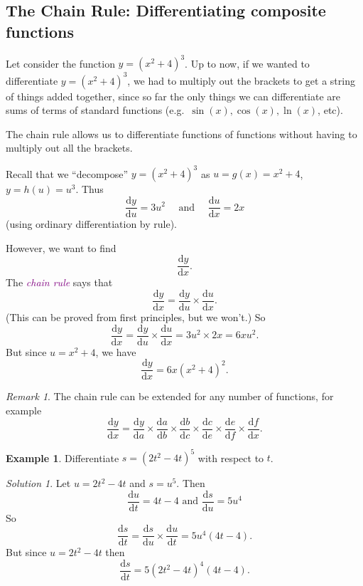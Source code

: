 \documentclass[
  english,
  11pt,
  oneside]{book}
\newcommand{\slide}{}
\theoremstyle{definition}
\theoremstyle{definition}
\newtheorem{example}{Example}[chapter]
\theoremstyle{definition}
\theoremstyle{definition}
\theoremstyle{remark}
\newtheorem*{remark}{Remark}
\newtheorem*{solution}{Solution}
\begin{document}
\subsection{The Chain Rule: Differentiating composite functions}\label{the-chain-rule-differentiating-composite-functions}

Let consider the function \(y = (x^2+ 4)^3\). Up to now, if we wanted to differentiate \(y = (x^2 + 4)^3\), we had to multiply out the brackets to get a string of things added together, since so far the only things we can differentiate are sums of terms of standard functions (e.g.~\(\sin(x), \cos(x), \ln(x)\), etc).

The chain rule allows us to differentiate functions of functions without having to multiply out all the brackets.

\slide

Recall that we ``decompose'' \(y=(x^2+4)^3\) as \(u = g(x) = x^2+4\), \(y = h(u) = u^3\).
Thus
\[\frac{\mathrm{d} y}{\mathrm{d} u} = 3u^2 \quad\text{ and }\quad
\frac{\mathrm{d} u}{\mathrm{d} x} = 2x\]
(using ordinary differentiation by rule).

However, we want to find
\[\frac{\mathrm{d} y}{\mathrm{d} x}.\]
The \textcolor{purple}{\em chain rule} says that
\[\frac{\mathrm{d} y}{\mathrm{d} x} = \frac{\mathrm{d} y}{\mathrm{d} u}\times \frac{\mathrm{d} u}{\mathrm{d} x}.\]
(This can be proved from first principles, but we won't.)
So
\[\frac{\mathrm{d} y}{\mathrm{d} x} = \frac{\mathrm{d} y}{\mathrm{d} u}\times \frac{\mathrm{d} u}{\mathrm{d} x} = 3u^2\times 2x = 6xu^2.\]
But since \(u = x^2+4\), we have
\[\frac{\mathrm{d} y}{\mathrm{d} x} = 6x(x^2 +4)^2.\]

\begin{remark}
The chain rule can be extended for any number of functions, for example
\[\frac{\mathrm{d} y}{\mathrm{d} x} = \frac{\mathrm{d} y}{\mathrm{d} a}\times \frac{\mathrm{d} a}{\mathrm{d} b}\times \frac{\mathrm{d} b}{\mathrm{d} c}\times \frac{\mathrm{d} c}{\mathrm{d} e}\times\frac{\mathrm{d} e}{\mathrm{d} f}\times\frac{\mathrm{d} f}{\mathrm{d} x}.\]
\end{remark}

\slide

\begin{example}
Differentiate \(s = (2t^2- 4t)^5\) with respect to \(t\).
\end{example}

\begin{solution}
Let \(u = 2t^2-4t\) and \(s = u^5\). Then
\[\frac{\mathrm{d} u}{\mathrm{d} t} = 4t-4\text{ and }\frac{\mathrm{d} s}{\mathrm{d} u} = 5u^4\]
So
\[\frac{\mathrm{d} s}{\mathrm{d} t} = \frac{\mathrm{d} s}{\mathrm{d} u}\times\frac{\mathrm{d} u}{\mathrm{d} t} = 5u^4(4t-4).\]
But since \(u = 2t^2-4t\) then
\[\frac{\mathrm{d} s}{\mathrm{d} t} = 5(2t^2-4t)^4(4t-4).\]
\end{solution}
\end{document}
